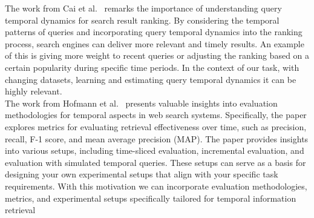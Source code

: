 The work from Cai et al.~\cite{cai2014learning} remarks the importance of understanding query temporal dynamics for
search result ranking.
By considering the temporal patterns of queries and incorporating query temporal dynamics into the ranking process,
search engines can deliver more relevant and timely results.
An example of this is giving more weight to recent queries or adjusting the ranking based on a certain popularity during
specific time periods.
In the context of our task, with changing datasets, learning and estimating query temporal dynamics it can be highly
relevant.\\

The work from Hofmann et al.~\cite{hofmann2014evaluating} presents valuable insights into evaluation methodologies for
temporal aspects in web search systems.
Specifically, the paper explores metrics for evaluating retrieval effectiveness over time, such as precision, recall,
F-1 score, and mean average precision (MAP).
The paper provides insights into various setups, including time-sliced evaluation, incremental evaluation, and
evaluation with simulated temporal queries.
These setups can serve as a basis for designing your own experimental setups that align with your specific task
requirements.
With this motivation we can incorporate evaluation methodologies, metrics, and experimental setups specifically tailored
for temporal information retrieval\\

